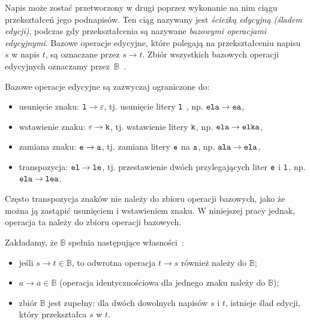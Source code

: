 \documentclass{praca1}
\begin{document}
Napis może zostać przetworzony w drugi poprzez wykonanie na nim ciągu przekształceń jego podnapisów. Ten ciąg nazywany jest \emph{ścieżką edycyjną (śladem edycji)}, podczas gdy przekształcenia są nazywane \emph{bazowymi operacjami edycyjnymi}. Bazowe operacje edycyjne, które polegają na przekształceniu napisu $s$ w napis $t$, są oznaczane przez $s \rightarrow t$. Zbiór wszystkich bazowych operacji edycyjnych oznaczamy przez~$\mathbb{B}$~\cite{Boytsov2011:indexingmethods}.


Bazowe operacje edycyjne są zazwyczaj ograniczone do:
\begin{itemize}
\item usunięcie znaku: $\verb|l| \rightarrow \varepsilon$, tj. usunięcie litery $\verb|l|$ , np. $\verb|ela| \rightarrow \verb|ea|$,
\item wstawienie znaku: $\varepsilon \rightarrow \verb|k|$, tj. wstawienie litery $\verb|k|$, np. $\verb|ela| \rightarrow \verb|elka|$,
\item zamiana znaku: $\verb|e| \rightarrow \verb|a|$, tj. zamiana litery $\verb|e|$ na $\verb|a|$, np. $\verb|ala| \rightarrow \verb|ela|$,
\item transpozycja: $\verb|el| \rightarrow \verb|le|$, tj. przestawienie dwóch przylegających liter $\verb|e|$ i $\verb|l|$, np. $\verb|ela| \rightarrow \verb|lea|$.
\end{itemize}

Często transpozycja znaków nie należy do zbioru operacji bazowych, jako że można ją zastąpić usunięciem i wstawieniem znaku. W niniejszej pracy jednak, operacja ta należy do zbioru operacji bazowych.


\begin{property}\label{wl:001}
Zakładamy, że $\mathbb{B}$ spełnia następujące własności~\cite{Boytsov2011:indexingmethods}:
\begin{itemize}
\item jeśli $s \rightarrow t \in \mathbb{B}$, to odwrotna operacja $t \rightarrow s$ również należy do $\mathbb{B}$;
\item $a \rightarrow a \in \mathbb{B}$ (operacja identycznościowa dla jednego znaku należy do $\mathbb{B}$);
\item zbiór $\mathbb{B}$ jest zupełny: dla dwóch dowolnych napisów $s$ i $t$, istnieje ślad edycji, który przekształca $s$ w $t$.
\end{itemize}
\end{property}
\end{document}
